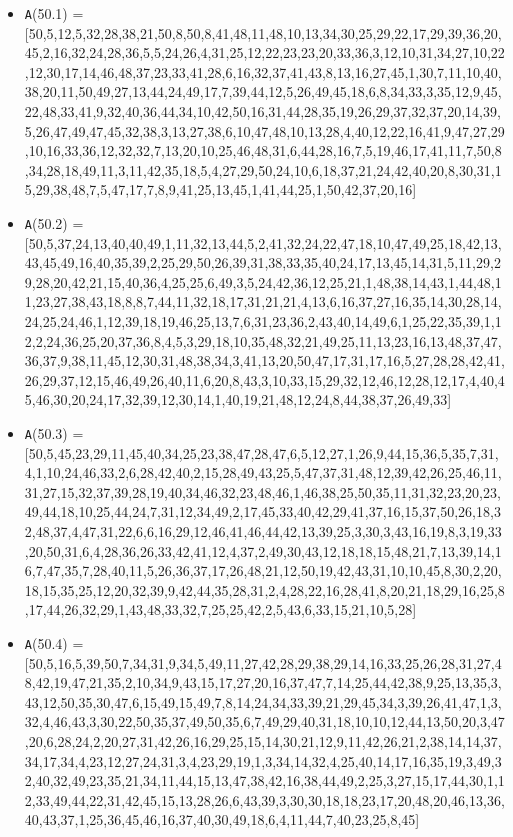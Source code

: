 \documentclass[runningheads,a4paper]{llncs}
\begin{document}
\begin{itemize}
	\item {\texttt A(50.1) = } [50,5,12,5,32,28,38,21,50,8,50,8,41,48,11,48,10,13,34,30,25,29,22,17,29,39,36,20,45,2,16,32,24,28,36,5,5,24,26,4,31,25,12,22,23,23,20,33,36,3,12,10,31,34,27,10,22,12,30,17,14,46,48,37,23,33,41,28,6,16,32,37,41,43,8,13,16,27,45,1,30,7,11,10,40,38,20,11,50,49,27,13,44,24,49,17,7,39,44,12,5,26,49,45,18,6,8,34,33,3,35,12,9,45,22,48,33,41,9,32,40,36,44,34,10,42,50,16,31,44,28,35,19,26,29,37,32,37,20,14,39,5,26,47,49,47,45,32,38,3,13,27,38,6,10,47,48,10,13,28,4,40,12,22,16,41,9,47,27,29,10,16,33,36,12,32,32,7,13,20,10,25,46,48,31,6,44,28,16,7,5,19,46,17,41,11,7,50,8,34,28,18,49,11,3,11,42,35,18,5,4,27,29,50,24,10,6,18,37,21,24,42,40,20,8,30,31,15,29,38,48,7,5,47,17,7,8,9,41,25,13,45,1,41,44,25,1,50,42,37,20,16]
	\item {\texttt A(50.2) = } [50,5,37,24,13,40,40,49,1,11,32,13,44,5,2,41,32,24,22,47,18,10,47,49,25,18,42,13,43,45,49,16,40,35,39,2,25,29,50,26,39,31,38,33,35,40,24,17,13,45,14,31,5,11,29,29,28,20,42,21,15,40,36,4,25,25,6,49,3,5,24,42,36,12,25,21,1,48,38,14,43,1,44,48,11,23,27,38,43,18,8,8,7,44,11,32,18,17,31,21,21,4,13,6,16,37,27,16,35,14,30,28,14,24,25,24,46,1,12,39,18,19,46,25,13,7,6,31,23,36,2,43,40,14,49,6,1,25,22,35,39,1,12,2,24,36,25,20,37,36,8,4,5,3,29,18,10,35,48,32,21,49,25,11,13,23,16,13,48,37,47,36,37,9,38,11,45,12,30,31,48,38,34,3,41,13,20,50,47,17,31,17,16,5,27,28,28,42,41,26,29,37,12,15,46,49,26,40,11,6,20,8,43,3,10,33,15,29,32,12,46,12,28,12,17,4,40,45,46,30,20,24,17,32,39,12,30,14,1,40,19,21,48,12,24,8,44,38,37,26,49,33]
	\item {\texttt A(50.3) = } [50,5,45,23,29,11,45,40,34,25,23,38,47,28,47,6,5,12,27,1,26,9,44,15,36,5,35,7,31,4,1,10,24,46,33,2,6,28,42,40,2,15,28,49,43,25,5,47,37,31,48,12,39,42,26,25,46,11,31,27,15,32,37,39,28,19,40,34,46,32,23,48,46,1,46,38,25,50,35,11,31,32,23,20,23,49,44,18,10,25,44,24,7,31,12,34,49,2,17,45,33,40,42,29,41,37,16,15,37,50,26,18,32,48,37,4,47,31,22,6,6,16,29,12,46,41,46,44,42,13,39,25,3,30,3,43,16,19,8,3,19,33,20,50,31,6,4,28,36,26,33,42,41,12,4,37,2,49,30,43,12,18,18,15,48,21,7,13,39,14,16,7,47,35,7,28,40,11,5,26,36,37,17,26,48,21,12,50,19,42,43,31,10,10,45,8,30,2,20,18,15,35,25,12,20,32,39,9,42,44,35,28,31,2,4,28,22,16,28,41,8,20,21,18,29,16,25,8,17,44,26,32,29,1,43,48,33,32,7,25,25,42,2,5,43,6,33,15,21,10,5,28]
	\item {\texttt A(50.4) = } [50,5,16,5,39,50,7,34,31,9,34,5,49,11,27,42,28,29,38,29,14,16,33,25,26,28,31,27,48,42,19,47,21,35,2,10,34,9,43,15,17,27,20,16,37,47,7,14,25,44,42,38,9,25,13,35,3,43,12,50,35,30,47,6,15,49,15,49,7,8,14,24,34,33,39,21,29,45,34,3,39,26,41,47,1,3,32,4,46,43,3,30,22,50,35,37,49,50,35,6,7,49,29,40,31,18,10,10,12,44,13,50,20,3,47,20,6,28,24,2,20,27,31,42,26,16,29,25,15,14,30,21,12,9,11,42,26,21,2,38,14,14,37,34,17,34,4,23,12,27,24,31,3,4,23,29,19,1,3,34,14,32,4,25,40,14,17,16,35,19,3,49,32,40,32,49,23,35,21,34,11,44,15,13,47,38,42,16,38,44,49,2,25,3,27,15,17,44,30,1,12,33,49,44,22,31,42,45,15,13,28,26,6,43,39,3,30,30,18,18,23,17,20,48,20,46,13,36,40,43,37,1,25,36,45,46,16,37,40,30,49,18,6,4,11,44,7,40,23,25,8,45]

\end{itemize}
\end{document}
